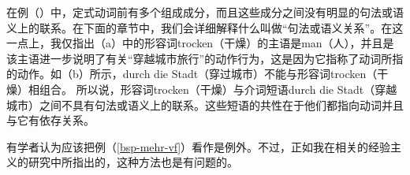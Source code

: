 \noindent
在例（）中，定式动词前有多个组成成分，而且这些成分之间没有明显的句法或语义上的联系。在下面的章节中，我们会详细解释什么叫做“句法或语义关系”。在这一点上，我仅指出（a）中的形容词trocken（干燥）的主语是man（人），并且是该主语进一步说明了有关“穿越城市旅行”的动作行为，这是因为它指称了动词所指的动作。如（b）所示，durch die Stadt（穿过城市）不能与形容词trocken（干燥）相组合。
\eal
{}
\zl
所以说，形容词trocken（干燥）与介词短语durch die Stadt（穿越城市）之间不具有句法或语义上的联系。这些短语的共性在于他们都指向动词并且与它有依存关系。

有学者认为应该把例（\ref{bsp-mehr-vf}）看作是例外。不过，正如我在相关的经验主义的研究中所指出的，这种方法也是有问题的\citep{Mueller2003b}。

